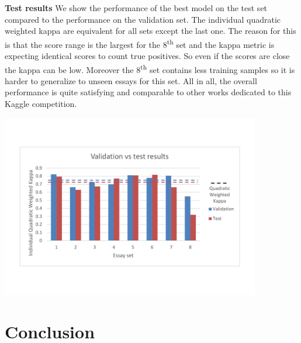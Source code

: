 \documentclass[a4paper,12pt,english]{article}
\newcommand{\TODO}{\fbox{\textcolor{red}{TODO}}}
\begin{document}
\textbf{Test results} We show the performance of the best model on the test set compared to the performance on the validation set. The individual quadratic weighted kappa are equivalent for all sets except the last one. The reason for this is that the score range is the largest for the 8\textsuperscript{th} set and the kappa metric is expecting identical scores to count true positives. So even if the scores are close the kappa can be low. Moreover the 8\textsuperscript{th} set contains less training samples so it is harder to generalize to unseen essays for this set. All in all, the overall performance is quite satisfying and comparable to other works dedicated to this Kaggle competition.

\begin{center}
\vspace*{-1.5cm}
\includegraphics[width=0.85\textwidth]{fig/test.pdf}
\vspace*{-1.5cm}
\end{center}

\section{Conclusion}
\TODO{}

 

\end{document}
